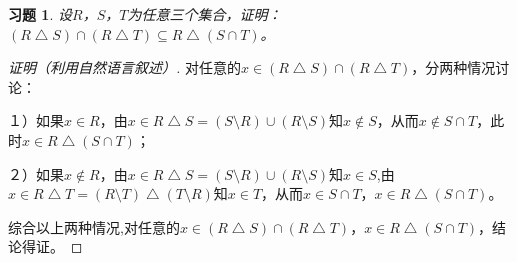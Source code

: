 \documentclass{article}
\begin{document}
\begin{CJK}{UTF8}{gbsn}
  \newtheorem*{Ex}{习题}
\begin{Ex}
      设$R$，$S$，$T$为任意三个集合，证明：$(R\bigtriangleup S)\cap (R\bigtriangleup T)\subseteq R\bigtriangleup (S\cap T)$。
    \end{Ex}

    \begin{proof}[证明（利用自然语言叙述）]
      对任意的$x\in (R\bigtriangleup S)\cap (R\bigtriangleup T)$，分两种情况讨论：

      １）如果$x\in R$，由$x\in R\bigtriangleup S=(S\setminus R)\cup (R\setminus S)$知$x \notin S$，从而$x\notin S\cap T$，此时$x\in R\bigtriangleup (S\cap T)$；

      ２）如果$x\notin R$，由$x\in R\bigtriangleup S=(S\setminus R)\cup (R\setminus S)$知$x\in S$,由$x\in R\bigtriangleup T = (R\setminus T)\bigtriangleup (T\setminus R)$知$x\in T$，从而$x\in S\cap T$，$x\in R\bigtriangleup (S\cap T)$。

      综合以上两种情况,对任意的$x\in (R\bigtriangleup S)\cap (R\bigtriangleup T)$，$x\in R\bigtriangleup (S\cap T)$，结论得证。
      
    \end{proof}
    

\end{CJK}
\end{document}

